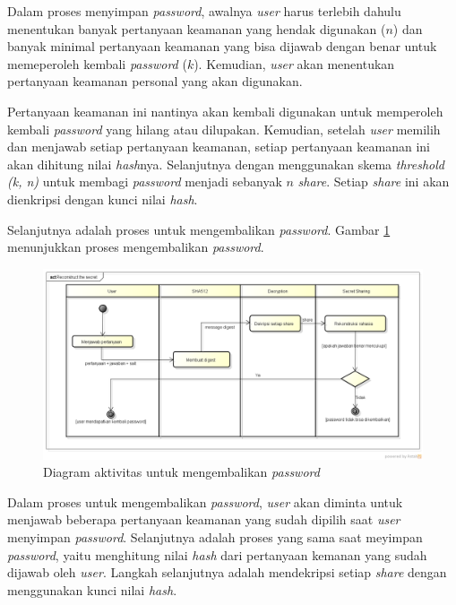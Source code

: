 Dalam proses menyimpan \textit{password}, awalnya \textit{user} harus terlebih dahulu menentukan banyak pertanyaan keamanan yang hendak digunakan (\begin{math}n\end{math}) dan banyak minimal pertanyaan keamanan yang bisa dijawab dengan benar untuk memeperoleh kembali \textit{password} (\begin{math}k\end{math}). Kemudian, \textit{user} akan menentukan pertanyaan keamanan personal yang akan digunakan.

Pertanyaan keamanan ini nantinya akan kembali digunakan untuk memperoleh kembali \textit{password} yang hilang atau dilupakan. Kemudian, setelah \textit{user} memilih dan menjawab setiap pertanyaan keamanan, setiap pertanyaan keamanan ini akan dihitung nilai \textit{hash}nya. Selanjutnya dengan menggunakan skema \textit{threshold (k, n)} untuk membagi \textit{password} menjadi sebanyak \begin{math}n\end{math} \textit{share}. Setiap \textit{share} ini akan dienkripsi dengan kunci nilai \textit{hash}.

Selanjutnya adalah proses untuk mengembalikan \textit{password}. Gambar \ref{fig:reconstruct} menunjukkan proses mengembalikan \textit{password}.

\begin{figure}[H]
	\centerline{\includegraphics[scale=0.4]{Gambar/reconstruct-secret}}
	\caption{Diagram aktivitas untuk mengembalikan \textit{password}}\label{fig:reconstruct}
\end{figure}

Dalam proses untuk mengembalikan \textit{password}, \textit{user} akan diminta untuk menjawab beberapa pertanyaan keamanan yang sudah dipilih saat \textit{user} menyimpan \textit{password}. Selanjutnya adalah proses yang sama saat meyimpan \textit{password}, yaitu menghitung nilai \textit{hash} dari pertanyaan kemanan yang sudah dijawab oleh \textit{user}. Langkah selanjutnya adalah mendekripsi setiap \textit{share} dengan menggunakan kunci nilai \textit{hash}.


